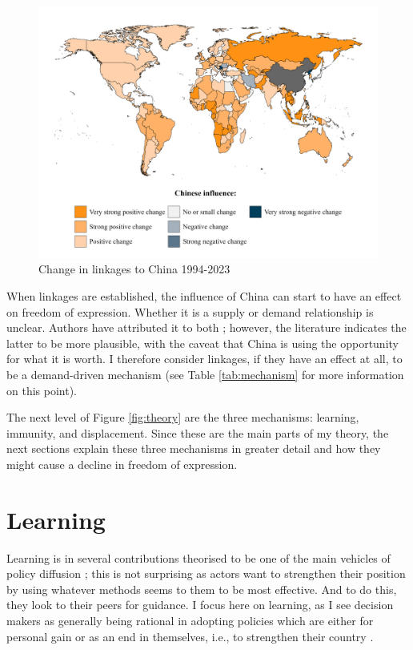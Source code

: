\begin{figure}
    \centering
    \includegraphics[width=\linewidth]{graphics/chinese_influence.jpeg}
    \caption{Change in linkages to China 1994-2023}
    \label{fig:link-china}
\end{figure}

When linkages are established, the influence of China can start to have an effect on freedom of expression. Whether it is a supply or demand relationship is unclear. Authors have attributed it to both \citep[e.g., see:][]{ambrosio_rise_2012, bader_china_2015, brand_authoritarian_2015, economy_exporting_2020, gamso_is_2021, loughlin_chinese_2021, risse_democracy_2015, toettoe_foreign_2023, weyland_autocratic_2017}; however, the literature indicates the latter to be more plausible, with the caveat that China is using the opportunity for what it is worth. I therefore consider linkages, if they have an effect at all, to be a demand-driven mechanism (see Table \ref{tab:mechanism} for more information on this point). 

The next level of Figure \ref{fig:theory} are the three mechanisms: learning, immunity, and displacement. Since these are the main parts of my theory, the next sections explain these three mechanisms in greater detail and how they might cause a decline in freedom of expression.

\section{Learning}
Learning is in several contributions theorised to be one of the main vehicles of policy diffusion \citep{gilardi_four_2016, shipan_mechanisms_2008, simmons_introduction_2006}; this is not surprising as actors want to strengthen their position by using whatever methods seems to them to be most effective. And to do this, they look to their peers for guidance. I focus here on learning, as I see decision makers as generally being rational in adopting policies which are either for personal gain or as an end in themselves, i.e., to strengthen their country \citep{shipan_mechanisms_2008}.

